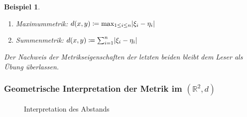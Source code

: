 \documentclass[ngerman,titlepage,twoside, parskip=half*]{scrreprt}
\newcommand*{\R}{\mathbb{R}}
\theoremstyle{break}
\theoremstyle{nonumberbreak}
\newtheorem{beispiel}{Beispiel}
\newtheorem{proof}{Beweis:}
\DeclarePairedDelimiter{\abs}{\lvert}{\rvert}
\begin{document}
\begin{beispiel}
\begin{enumerate}
\begin{enumerate}[(M1)]
\begin{description}
{      1909-01-12), deutscher Mathematiker und Physiker}
      \begin{gather*}\sqrt{\sum_{i=1}^n \abs{a_i + b_i}^2} \leq \sqrt{\sum_{i=1}^n
      \abs{a_i}^2} + \sqrt{\sum_{i=1}^n \abs{b_i}^2}\end{gather*}
      \begin{proof}
	Sei o.\,B.\,d.\,A. $\sum_{i=1}^n \abs{a_i +b_i}^2 > 0$.
      \begin{align*}
        \sum_{i=1}^n \abs{a_i +b_i}^2 & = \sum_{i=1}^n \abs{a_i +b_i} \abs{a_i
	   +b_i} \leq \sum_{i=1}^n (\abs{a_i}+ \abs{b_i}) \abs{a_i +b_i}\\
        & = \sum_{i=1}^n \abs{a_i} \abs{a_i +b_i} + \sum_{i=1}^n \abs{b_i}
	   \abs{a_i +b_i}\\
        & \leq \sqrt{\sum_{i=1}^n \abs{a_i}^2} \sqrt{\sum_{i=1}^n \abs{a_i
	   +b_i}^2} + \sqrt{\sum_{i=1}^n \abs{b_i}^2} \sqrt{\sum_{i=1}^n
	   \abs{a_i +b_i}^2}\\
	& \Rightarrow \sqrt{\sum_{i=1}^n \abs{a_i +b_i}^2} \leq
	   \sqrt{\sum_{i=1}^n \abs{a_i}^2} + \sqrt{\sum_{i=1}^n \abs{b_i}^2}
      \end{align*}
      \end{proof}
    \end{description}
  \end{enumerate}
\item Maximummetrik: $d(x,y)\coloneqq \max_{1 \leq i \leq n}
  \abs{\xi_{i}-\eta_{i}}$
\item Summenmetrik: $d(x,y) \coloneqq \sum_{i=1}^n \abs{\xi_{i}-\eta_{i}}$
\end{enumerate}
  Der Nachweis der Metrikseigenschaften der letzten beiden bleibt dem Leser
  als Übung überlassen.
\end{beispiel}

\subsubsection{Geometrische Interpretation der Metrik im $(\R^2,d)$}

\begin{figure}[htb]
  \centering
  \caption{Interpretation des Abstands}
  \label{fig:inter-abstand}
\end{figure}
\end{document}
